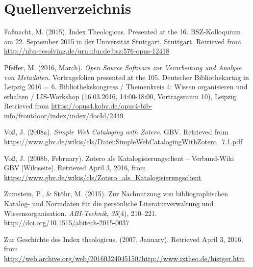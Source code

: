 \documentclass[a4paper,
fontsize=11pt,
oneside,
numbers=noperiodatend,
parskip=half-,
bibliography=totoc,
final
]{scrartcl}
\begin{document}
\section*{Quellenverzeichnis}\label{quellenverzeichnis}

Faßnacht, M. (2015). Index Theologicus. Presented at the 16.
BSZ-Kolloquium am 22. September 2015 in der Universität Stuttgart,
Stuttgart. Retrieved from
\url{http://nbn-resolving.de/urn:nbn:de:bsz:576-opus-12418}

Pfeffer, M. (2016, March). \emph{Open Source Software zur Verarbeitung
und Analyse von Metadaten}. Vortragsfolien presented at the 105.
Deutscher Bibliothekartag in Leipzig 2016 = 6. Bibliothekskongress /
Themenkreis 4: Wissen organisieren und erhalten / LIS-Workshop
(16.03.2016, 14:00-18:00, Vortragsraum 10), Leipzig. Retrieved from
\url{https://opus4.kobv.de/opus4-bib-info/frontdoor/index/index/docId/2449}

Voß, J. (2008a). \emph{Simple Web Cataloging with Zotero}. GBV.
Retrieved from
\url{https://www.gbv.de/wikis/cls/Datei:SimpleWebCatalogingWithZotero_7.1.pdf}

Voß, J. (2008b, February). Zotero als Katalogisierungsclient --
Verbund-Wiki GBV {[}Wikiseite{]}. Retrieved April 3, 2016, from
\url{https://www.gbv.de/wikis/cls/Zotero_als_Katalogisierungsclient}

Zumstein, P., \& Stöhr, M. (2015). Zur Nachnutzung von bibliographischen
Katalog- und Normdaten für die persönliche Literaturverwaltung und
Wissensorganisation. \emph{ABI-Technik}, \emph{35}(4), 210--221.
\url{http://doi.org/10.1515/abitech-2015-0037}

Zur Geschichte des Index theologicus. (2007, January). Retrieved April
3, 2016, from
\url{http://web.archive.org/web/20160324045150/http://www.ixtheo.de/histger.htm}

\end{document}
